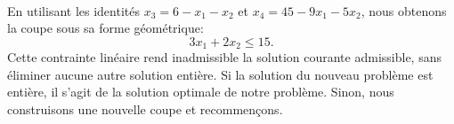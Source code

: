 \begin{example}
\begin{align*}
\end{align*}
En utilisant les identités $x_3 = 6 - x_1 - x_2$ et $x_4 = 45 - 9x_1 - 5x_2$, nous obtenons la coupe sous sa forme géométrique:
\[
3x_1 + 2x_2 \leq 15.
\]
Cette contrainte linéaire rend inadmissible la solution courante admissible, sans éliminer aucune autre solution entière. Si la solution du nouveau problème est entière, il s'agit de la solution optimale de notre problème.
Sinon, nous construisons une nouvelle coupe et recommençons.
\end{example}

